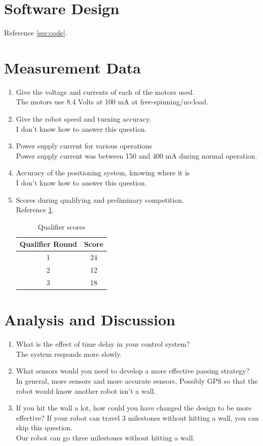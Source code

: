 \documentclass[12pt]{article}
\newcommand{\probb}{}
\newcommand{\soll}{\vspace{0.5em}\\}
\begin{document}
\section{Software Design}
Reference
\cref{sec:code}.

\section{Measurement Data}
\begin{enumerate}
\item \probb Give the voltage and currents of each of the motors used.
  \soll The motors use 8.4 Volts at 100 mA at free-spinning/no-load.
\item \probb Give the robot speed and turning accuracy. \soll I don't know how
  to answer this question.
\item \probb Power supply current for various operations \soll Power
  supply current was between 150 and 400 mA during normal operation.
\item \probb Accuracy of the positioning system, knowing where it is
  \soll I don't know how to answer this question.
\item \probb Scores during qualifying and preliminary competition.
  \soll Reference \cref{tab:qualifier}.
  \begin{table}
    \centering
    \begin{tabular}{c|c}
      Qualifier Round & Score \\ \hline
      1 & 24 \\
      2 & 12 \\
      3 & 18 \\
    \end{tabular}
    \caption{Qualifier scores}
    \label{tab:qualifier}
  \end{table}
\end{enumerate}

\section{Analysis and Discussion}

\begin{enumerate}[1)]
\item \probb What is the effect of time delay in your control system?
  \soll The system responds more slowly.
\item \probb What sensors would you need to develop a more effective
  passing strategy? \soll In general, more sensors and more accurate
  sensors, Possibly GPS so that the robot would know another robot
  isn't a wall.
\item \probb If you hit the wall a lot, how could you have changed the
  design to be more effective? If your robot can travel 3 milestones
  without hitting a wall, you can skip this question. \soll Our robot
  can go three milestones without hitting a wall.
\end{enumerate}
\end{document}
